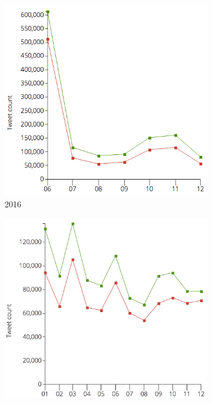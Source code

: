 \documentclass[11pt]{report}
\begin{document}
\begin{figure}[H]
        \begin{subfigure}[b]{0.35\textwidth}
                \includegraphics[width=\linewidth]{images/2016-sentiment.png}
                \caption{2016}
                \label{fig:gull}
        \end{subfigure}%
        \begin{subfigure}[b]{0.33\textwidth}
                \includegraphics[width=\linewidth]{images/2017-sentiment.png}

\end{subfigure}
\end{figure}
\end{document}
